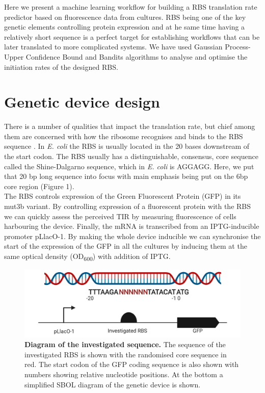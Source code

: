 \documentclass{article}
\begin{document}
Here we present a machine learning workflow for building a RBS translation rate predictor based on fluorescence data from cultures. RBS being one of the key genetic elements controlling protein expression and at he same time having a relatively short sequence is a perfect target for establishing workflows that can be later translated to more complicated systems. We have used Gaussian Process-Upper Confidence Bound and Bandits algorithms to analyse and optimise the initiation rates of the designed RBS.

\section{Genetic device design}
There is a number of qualities that impact the translation rate, but chief among them are concerned with how the ribosome recognises and binds to the RBS sequence \cite{Chen1994,Vellanoweth1992}. In \emph{E. coli} the RBS is usually located in the 20 bases downstream of the start codon. The RBS usually has a distinguishable, consensus, core sequence called the Shine-Dalgarno sequence, which in \emph{E. coli} is AGGAGG. Here, we put that 20 bp long sequence into focus with main emphasis being put on the 6bp core region (Figure 1).\\
The RBS controls expression of the Green Fluorescent Protein (GFP) in its mut3b variant. By controlling expression of a fluorescent protein with the RBS we can quickly assess the perceived TIR by measuring fluorescence of cells harbouring the device. Finally, the mRNA is transcribed from an IPTG-inducible promoter pLlacO-1. By making the whole device inducible we can synchronise the start of the expression of the GFP in all the cultures by inducing them at the same optical density (OD\textsubscript{600}) with addition of IPTG.\\


\begin{figure}[t]
    \centering
    \includegraphics[scale=0.6]{plots/RBS_anatomy.pdf}
    \caption{\textbf{Diagram of the investigated sequence.} The sequence of the investigated RBS is shown with the randomised core sequence in red. The start codon of the GFP coding sequence is also shown with numbers showing relative nucleotide positions. At the bottom a simplified SBOL diagram of the genetic device is shown.}
    \label{fig: Anatomy of the randomized sequence.}
\end{figure}
\end{document}
